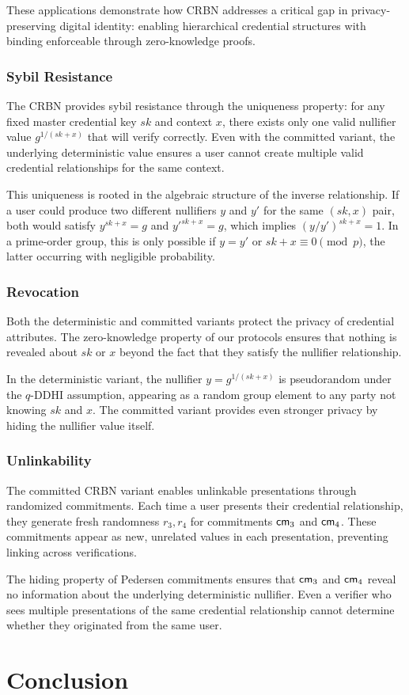 These applications demonstrate how CRBN addresses a critical gap in privacy-preserving digital identity: enabling hierarchical credential structures with binding enforceable through zero-knowledge proofs.


\subsubsection{Sybil Resistance}

The CRBN provides sybil resistance through the uniqueness property: for any fixed master credential key $sk$ and context $x$, there exists only one valid nullifier value $g^{1/(sk+x)}$ that will verify correctly. Even with the committed variant, the underlying deterministic value ensures a user cannot create multiple valid credential relationships for the same context.

This uniqueness is rooted in the algebraic structure of the inverse relationship. If a user could produce two different nullifiers $y$ and $y'$ for the same $(sk,x)$ pair, both would satisfy $y^{sk+x} = g$ and $y'^{sk+x} = g$, which implies $(y/y')^{sk+x} = 1$. In a prime-order group, this is only possible if $y = y'$ or $sk+x \equiv 0 \pmod{p}$, the latter occurring with negligible probability.

\subsubsection{Revocation}

Both the deterministic and committed variants protect the privacy of credential attributes. The zero-knowledge property of our protocols ensures that nothing is revealed about $sk$ or $x$ beyond the fact that they satisfy the nullifier relationship.

In the deterministic variant, the nullifier $y = g^{1/(sk+x)}$ is pseudorandom under the $q$-DDHI assumption, appearing as a random group element to any party not knowing $sk$ and $x$. The committed variant provides even stronger privacy by hiding the nullifier value itself.

\subsubsection{Unlinkability}

The committed CRBN variant enables unlinkable presentations through randomized commitments. Each time a user presents their credential relationship, they generate fresh randomness $r_3, r_4$ for commitments $\mathsf{cm}_3$ and $\mathsf{cm}_4$. These commitments appear as new, unrelated values in each presentation, preventing linking across verifications.

The hiding property of Pedersen commitments ensures that $\mathsf{cm}_3$ and $\mathsf{cm}_4$ reveal no information about the underlying deterministic nullifier. Even a verifier who sees multiple presentations of the same credential relationship cannot determine whether they originated from the same user.


\section{Conclusion}
    
